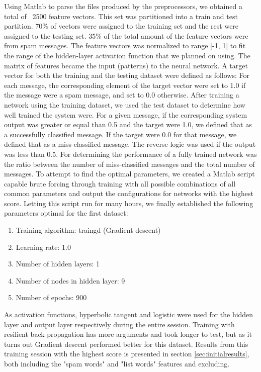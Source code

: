     Using Matlab to parse the files produced by the preprocessors, we obtained
    a total of ~2500 feature vectors. This set was partitioned into a train and
    test partition. 70\% of vectors were assigned to the training set and the
    rest were assigned to the testing set. 35\% of the total amount of the
    feature vectors were from spam messages. The feature vectors was
    normalized to range [-1, 1] to fit the range of the hidden-layer
    activation function that we planned on using. The matrix of features became
    the input (patterns) to the neural network. A target vector for both the
    training and the testing dataset were defined as follows: For each message,
    the corresponding element of the target vector were set to 1.0 if the
    message were a spam message, and set to 0.0 otherwise. 
    After training a network using the training dataset, we used the
    test dataset to determine how well trained the system were. 
    For a given message, if the corresponding system output was greater or
    equal than 0.5 and the target were 1.0, we defined that as a successfully
    classified message. If the target were 0.0 for that message, we defined
    that as a miss-classified message. The reverse logic was used if the output
    was less than 0.5.
    For determining the performance of a fully trained network was the ratio
    between the number of miss-classified messages and the total number of
    messages.
    To attempt to find the optimal parameters, we created a Matlab script
    capable brute forcing through training with all possible combinations of
    all common parameters and output the configurations for networks with the
    highest score. Letting this script run for many hours, we finally
    established the following parameters optimal for the first dataset:
    \begin{enumerate}
      \item Training algorithm: traingd (Gradient descent)
      \item Learning rate: 1.0
      \item Number of hidden layers: 1
      \item Number of nodes in hidden layer: 9
      \item Number of epochs: 900
    \end{enumerate}
    As activation functions, hyperbolic tangent and logistic were used
    for the hidden layer and output layer respectively during the entire
    session.  Training with resilient back propagation has more arguments and
    took longer to test, but as it turns out Gradient descent performed better
    for this dataset. Results from this training session with the highest score
    is presented in section \ref{sec:initialresults}, both including the "spam
    words" and "list words" features and excluding.

